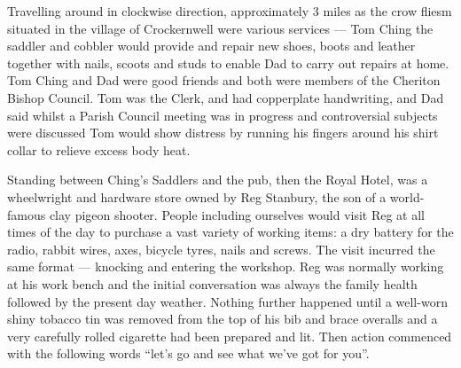 Travelling around in clockwise direction, approximately 3 miles as the crow
fliesm situated in the village of Crockernwell were various services --- Tom
Ching the saddler and cobbler would provide and repair new shoes, boots and
leather together with nails, scoots and studs to enable Dad to carry out
repairs at home. Tom Ching and Dad were good friends and both were members of
the Cheriton Bishop Council. Tom was the Clerk, and had copperplate
handwriting, and Dad said whilst a Parish Council meeting was in progress and
controversial subjects were discussed Tom would show distress by running his
fingers around his shirt collar to relieve excess body heat.

Standing between Ching's Saddlers and the pub, then the Royal Hotel, was a
wheelwright and hardware store owned by Reg Stanbury, the son of a world-famous
clay pigeon shooter. People including ourselves would visit Reg at all times of
the day to purchase a vast variety of working items: a dry battery for the
radio, rabbit wires, axes, bicycle tyres, nails and screws. The visit incurred
the same format --- knocking and entering the workshop. Reg was normally working
at his work bench and the initial conversation was always the family health
followed by the present day weather. Nothing further happened until a well-worn
shiny tobacco tin was removed from the top of his bib and brace overalls and a
very carefully rolled cigarette had been prepared and lit. Then action
commenced with the following words ``let's go and see what we've got for
you''.

